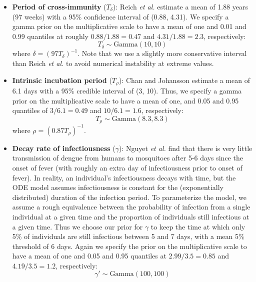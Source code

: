 \documentclass[12pt,letterpaper]{article}
\begin{document}
\begin{itemize}
\item \textbf{Period of cross-immunity} ($T_{\delta}$): Reich \emph{et al.} \cite{Reich2013} estimate a mean of 1.88 years (97 weeks) with a 95\% confidence interval of (0.88, 4.31).
We specify a gamma prior on the multiplicative scale to have a mean of one and 0.01 and 0.99 quantiles at roughly $0.88/1.88 = 0.47$ and $4.31/1.88 = 2.3$, respectively:
\begin{equation}
T_{\delta} \sim \text{Gamma}(10, 10)
\end{equation}
where $\delta = (97 T_\delta)^{-1}$.
Note that we use a slightly more conservative interval than Reich \emph{et al.} to avoid numerical instability at extreme values.
\\
\item \textbf{Intrinsic incubation period} ($T_{\rho}$): Chan and Johansson \cite{Chan2012} estimate a mean of 6.1 days with a 95\% credible interval of (3, 10).
Thus, we specify a gamma prior on the multiplicative scale to have a mean of one, and 0.05 and 0.95 quantiles of $3 / 6.1 = 0.49$ and $10 / 6.1 = 1.6$, respectively:
\begin{equation}
T_{\rho} \sim \text{Gamma}(8.3, 8.3)
\end{equation}
where $\rho = (0.87 T_{\rho})^{-1}$.
\\
\item \textbf{Decay rate of infectiousness} ($\gamma$): Nguyet \emph{et al.} \cite{Nguyet2013} find that there is very little transmission of dengue from humans to mosquitoes after 5-6 days since the onset of fever (with roughly an extra day of infectiousness prior to onset of fever).
In reality, an individual's infectiousness decays with time, but the ODE model assumes infectiousness is constant for the (exponentially distributed) duration of the infection period.    
To parameterize the model, we assume a rough equivalence between the probability of infection from a single individual at a given time and the proportion of individuals still infectious at a given time.
Thus we choose our prior for $\gamma$ to keep the time at which only 5\% of individuals are still infectious between 5 and 7 days, with a mean 5\% threshold of 6 days.
Again we specify the prior on the multiplicative scale to have a mean of one and 0.05 and 0.95 quantiles at $2.99/3.5 = 0.85$ and $4.19 / 3.5 = 1.2$, respectively:
\begin{equation}
\gamma' \sim \text{Gamma}(100, 100)
\end{equation}

\end{itemize}
\end{document}

